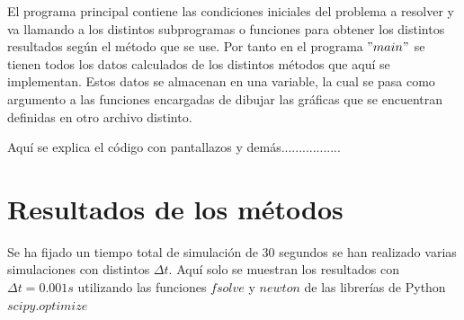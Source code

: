 \documentclass[12pt,a4paper]{article}
\begin{document}
El programa principal contiene las condiciones iniciales del problema a resolver y va llamando a los distintos subprogramas o funciones para obtener los distintos resultados según el método que se use. Por tanto en el programa $"main"$ se tienen todos los datos calculados de los distintos métodos que aquí se implementan. Estos datos se almacenan en una variable, la cual se pasa como argumento a las funciones encargadas de dibujar las gráficas que se encuentran definidas en otro archivo distinto.


Aquí se explica el código con pantallazos y demás.................

\section{Resultados de los métodos}
Se ha fijado un tiempo total de simulación de 30 segundos se han realizado varias simulaciones con distintos $\Delta t$. Aquí solo se muestran los resultados con $\Delta t = 0.001 s$ utilizando las funciones $fsolve$ y $newton$ de las librerías de Python $scipy.optimize$
\end{document}
